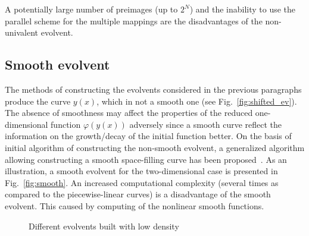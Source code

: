 \documentclass[procedia]{easychair}
\begin{document}
A potentially large number of preimages (up to $2^N$) and the inability to use the parallel
scheme for the multiple mappings are the disadvantages of the non-univalent evolvent.

\subsection{Smooth evolvent}

The methods of constructing the evolvents considered in the previous paragraphs produce the
curve $y(x)$, which in not a smooth one (see Fig.~\ref{fig:shifted_ev}). The absence of
smoothness may affect the properties of the reduced one-dimensional function $\varphi(y(x))$
adversely since a smooth curve reflect the information on the growth/decay of the initial
function better. On the basis of initial algorithm of constructing the non-smooth evolvent, a
generalized algorithm allowing constructing a smooth space-filling curve has been
proposed~\cite{Goryachih2017}. As an illustration, a smooth evolvent for the two-dimensional
case is presented in Fig.~\ref{fig:smooth}.
An increased computational complexity (several times as compared to the piecewise-linear
curves) is a disadvantage of the smooth evolvent. This caused by computing of the nonlinear smooth
functions.

\begin{figure}[ht]
    \centering
    \caption{Different evolvents built with low density}
\end{figure}
\end{document}
